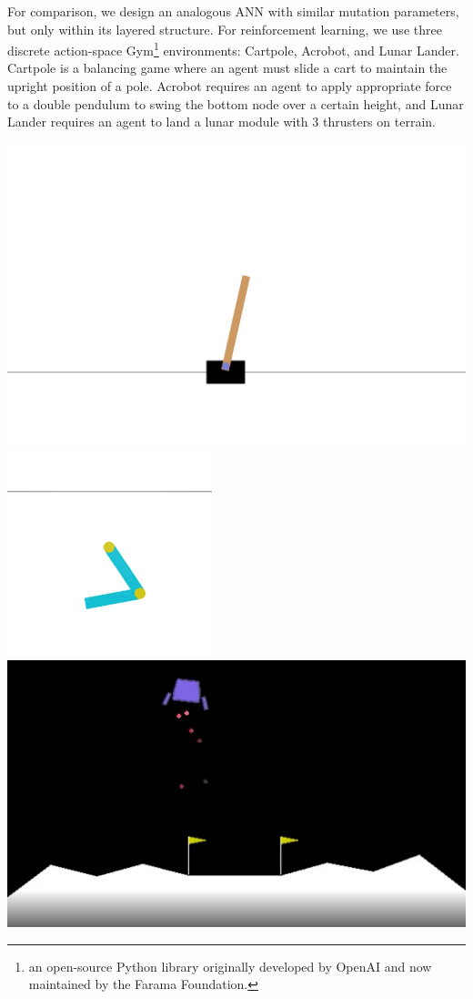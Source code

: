 \documentclass{article}
\begin{document}
\begin{multicols}{2}
	For comparison, we design an analogous ANN with similar mutation parameters, but only within its layered structure. For reinforcement learning, we use three discrete action-space Gym\footnote{an open-source Python library originally developed by OpenAI and now maintained by the Farama Foundation.} environments: Cartpole, Acrobot, and Lunar Lander. Cartpole is a balancing game where an agent must slide a cart to maintain the upright position of a pole. Acrobot requires an agent to apply appropriate force to a double pendulum to swing the bottom node over a certain height, and Lunar Lander requires an agent to land a lunar module with 3 thrusters on terrain.
	
	\begin{center}
		\includegraphics[scale=0.08]{figs/cartpole.png}
		\includegraphics[scale=0.26]{figs/acrobot.png}
		\includegraphics[scale=0.075]{figs/lunarlander.png}
		

\end{center}
\end{multicols}
\end{document}
